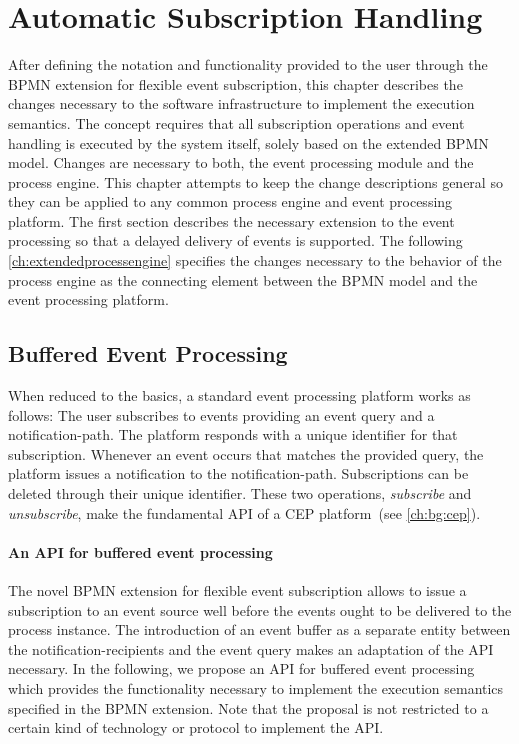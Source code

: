 \section{Automatic Subscription Handling}\label{ch:automaticsubscription}

After defining the notation and functionality provided to the user through the BPMN extension for flexible event subscription, this chapter describes the changes necessary to the software infrastructure to implement the execution semantics.
The concept requires that all subscription operations and event handling is executed by the system itself, solely based on the extended BPMN model.
Changes are necessary to both, the event processing module and the process engine. This chapter attempts to keep the change descriptions general so they can be applied to any common process engine and event processing platform.
The first section describes the necessary extension to the event processing so that a delayed delivery of events is supported.
The following \autoref{ch:extendedprocessengine} specifies the changes necessary to the behavior of the process engine as the connecting element between the BPMN model and the event processing platform.


\subsection{Buffered Event Processing}\label{ch:bufferedcep}
When reduced to the basics, a standard event processing platform works as follows: The user subscribes to events providing an event query and a notification-path. The platform responds with a unique identifier for that subscription.
Whenever an event occurs that matches the provided query, the platform issues a notification to the notification-path. Subscriptions can be deleted through their unique identifier.
These two operations, \textit{subscribe} and \textit{unsubscribe}, make the fundamental \acs{API} of a CEP platform~(see \autoref{ch:bg:cep}).

\paragraph{An API for buffered event processing}
The novel BPMN extension for flexible event subscription allows to issue a subscription to an event source well before the events ought to be delivered to the process instance. The introduction of an event buffer as a separate entity between the notification-recipients and the event query makes an adaptation of the API necessary.
In the following, we propose an API for buffered event processing which provides the functionality necessary to implement the execution semantics specified in the BPMN extension. Note that the proposal is not restricted to a certain kind of technology or protocol to implement the API.

